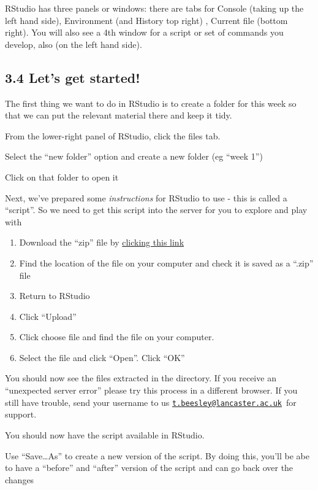 \documentclass[
]{book}
\begin{document}
RStudio has three panels or windows: there are tabs for Console (taking up the left hand side), Environment (and History top right) , Current file (bottom right). You will also see a 4th window for a script or set of commands you develop, also (on the left hand side).

\hypertarget{lets-get-started}{%
\subsection{3.4 Let's get started!}\label{lets-get-started}}

The first thing we want to do in RStudio is to create a folder for this week so that we can put the relevant material there and keep it tidy.

From the lower-right panel of RStudio, click the files tab.

Select the ``new folder'' option and create a new folder (eg ``week 1'')

Click on that folder to open it

Next, we've prepared some \emph{instructions} for RStudio to use - this is called a ``script''. So we need to get this script into the server for you to explore and play with

\begin{enumerate}
\def\labelenumi{\arabic{enumi}.}
\item
  Download the ``zip'' file by \href{files/Week_1/week_1.zip}{clicking this link}
\item
  Find the location of the file on your computer and check it is saved as a ``.zip'' file
\item
  Return to RStudio
\item
  Click ``Upload''
\item
  Click choose file and find the file on your computer.
\item
  Select the file and click ``Open''. Click ``OK''
\end{enumerate}

You should now see the files extracted in the directory. If you receive an ``unexpected server error'' please try this process in a different browser. If you still have trouble, send your username to us \href{mailto:t.beesley@lancaster.ac.uk}{\nolinkurl{t.beesley@lancaster.ac.uk}}~for support.

You should now have the script available in RStudio.

Use ``Save\ldots As'' to create a new version of the script. By doing this, you'll be abe to have a ``before'' and ``after'' version of the script and can go back over the changes
\end{document}
